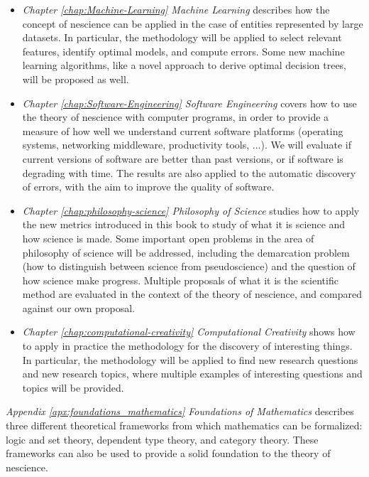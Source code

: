\begin{itemize}

\item \emph{Chapter \ref{chap:Machine-Learning} Machine Learning} describes how the concept of nescience can be applied in the case of entities represented by large datasets. In particular, the methodology will be applied to select relevant features, identify optimal models, and compute errors. Some new machine learning algorithms, like a novel approach to derive optimal decision trees, will be proposed as well.

\item \emph{Chapter \ref{chap:Software-Engineering} Software Engineering} covers how to use the theory of nescience with computer programs, in order to provide a measure of how well we understand current software platforms (operating systems, networking middleware, productivity tools, ...). We will evaluate if current versions of software are better than past versions, or if software is degrading with time. The results are also applied to the automatic discovery of errors, with the aim to improve the quality of software.

\item \emph{Chapter \ref{chap:philosophy-science} Philosophy of Science} studies how to apply the new metrics introduced in this book to study of what it is science and how science is made. Some important open problems in the area of philosophy of science will be addressed, including the demarcation problem (how to distinguish between science from pseudoscience) and the question of how science make progress. Multiple proposals of what it is the scientific method are evaluated in the context of the theory of nescience, and compared against our own proposal.

\item \emph{Chapter \ref{chap:computational-creativity} Computational Creativity} shows how to apply in practice the methodology for the discovery of interesting things. In particular, the methodology will be applied to find new research questions and new research topics, where multiple examples of interesting questions and topics will be provided.

\end{itemize}

\bigskip

\emph{Appendix \ref{apx:foundations_mathematics} Foundations of Mathematics} describes three different theoretical frameworks from which mathematics can be formalized: logic and set theory, dependent type theory, and category theory. These frameworks can also be used to provide a solid foundation to the theory of nescience.

